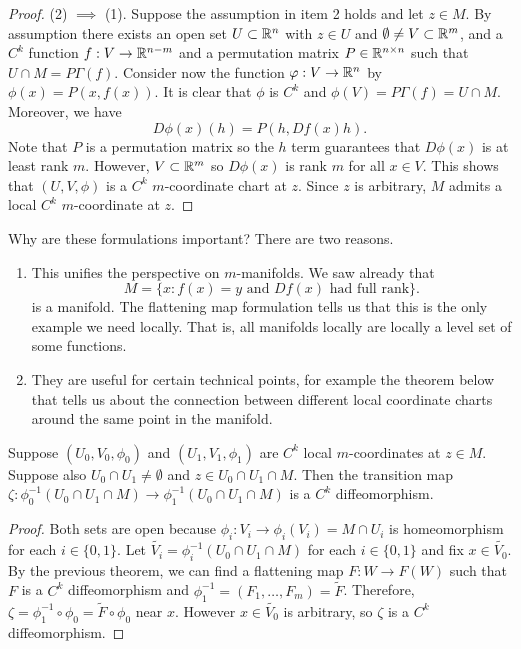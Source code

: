 \documentclass[a4paper]{article}
\begin{document}
\begin{proof}
(2) $\implies$ (1). Suppose the assumption in item 2 holds
and let $z \in M$. By assumption there exists an 
open set $U \subset \mathbb{R}^n$ with $z \in U$ and $\emptyset 
\neq V \subset \mathbb{R}^m$, and a $C^k$ function $f : V \to \mathbb{R}^{n - m}$
and a permutation matrix $P \in \mathbb{R}^{n \times n}$ such that 
$U \cap M = P \Gamma (f)$. Consider now the function 
$\varphi: V \to \mathbb{R}^n$ by $\phi(x) = P (x, f(x))$. It is 
clear that $\phi$ is $C^k$ and $\phi(V) = P \Gamma(f)
= U \cap M$. Moreover, we have 
\[
D \phi(x) (h) = P (h, Df(x) h).
\]
Note that $P$ is a permutation matrix so the $h$ term
guarantees that $D \phi(x)$ is at least rank $m$. However,
$V \subset \mathbb{R}^m$ so $D \phi(x)$ is rank $m$ for all 
$x \in V$. This shows that $(U, V, \phi)$ is a $C^k$
$m$-coordinate chart at $z$. Since $z$ is arbitrary, 
$M$ admits a local 
$C^k$ $m$-coordinate at $z$.
\end{proof}

Why are these formulations important? There are two reasons.
\begin{enumerate}
\item This unifies the perspective on $m$-manifolds. We saw
already that 
\[
M = \{x : \text{$f(x) = y$ and $Df(x)$ had full rank}\}.
\]
is a manifold. The flattening map formulation tells us 
that this is the only example we need locally.
That is, all manifolds locally are locally a level set of
some functions.

\item They are useful for certain technical points, for 
example the theorem below that tells us about the connection 
between different local coordinate charts around the same 
point in the manifold.
\end{enumerate}

\begin{thm}
Suppose $(U_0, V_0, \phi_0)$ and $(U_1, V_1, \phi_1)$
are $C^k$ local $m$-coordinates at $z \in M$. Suppose
also $U_0 \cap U_1 \neq \emptyset$ and $z \in U_0 \cap
U_1 \cap M$. Then the transition map
$\zeta : \phi_0^{-1}(U_0 \cap U_1 \cap M)
\to \phi_1^{-1} (U_0 \cap U_1 \cap M)$ is a $C^k$
diffeomorphism.
\end{thm}

\begin{proof}
Both sets are open because $\phi_i : V_i \to \phi_i(V_i)
= M \cap U_i$ is homeomorphism for each $i \in \{0, 1\}$.
Let $\tilde{V_i} = \phi_i^{-1} (U_0 \cap U_1 \cap M)$
for each $i \in \{0, 1\}$
and fix $x \in \tilde{V_0}$. By the previous theorem, we
can find a flattening map $F : W \to F(W)$ such that
$F$ is a $C^k$ diffeomorphism and $\phi_1^{-1} = (F_1,
\dots, F_m) = \tilde{F}$.
Therefore, $\zeta = \phi_1^{-1} \circ \phi_0
= \tilde{F} \circ \phi_0$
near $x$. However $x \in \tilde{V_0}$ is arbitrary,
so $\zeta$ is a $C^k$ diffeomorphism.
\end{proof}
\end{document}

